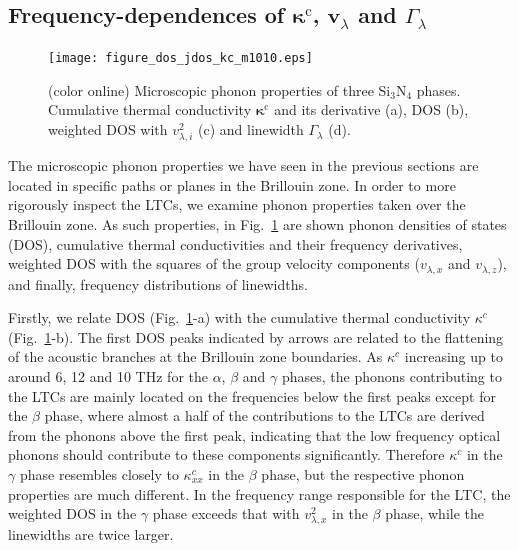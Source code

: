 \documentclass[twocolumn,amsmath,amssymb,a4paper,prb,superscriptaddress,floatfix]{revtex4-1}
\begin{document}
\subsection{Frequency-dependences of $\boldsymbol{\kappa}^\text{c}$, $\mathbf{v}$$_\lambda$ and $\Gamma_\lambda$}

\begin{figure}[ht]
 \begin{center}
  \texttt{[image: figure\_dos\_jdos\_kc\_m1010.eps]}
  \caption{(color online) Microscopic phonon properties of three Si$_3$N$_4$
	  phases. Cumulative thermal conductivity $\mathbf{\kappa}^\text{c}$ and its derivative
	  (a), DOS (b), weighted DOS with $v_{\lambda,i}^2$ (c) and linewidth $\Gamma_\lambda$ (d).
  \label{fig:Fig5_338_rev} }
 \end{center}
\end{figure}

The microscopic phonon properties we have seen in the previous sections are
located in specific paths or planes in the Brillouin zone. In order to more
rigorously inspect the LTCs, we examine  phonon properties taken over the
Brillouin zone. As such properties, in Fig.~\ref{fig:Fig5_338_rev} are shown
phonon densities of states (DOS), cumulative thermal conductivities and their
frequency derivatives, weighted DOS with the squares of the group velocity
components ($v_{\lambda,x}$ and $v_{\lambda,z}$), and finally,
frequency distributions of linewidths.

Firstly, we relate DOS (Fig.~\ref{fig:Fig5_338_rev}-a) with the cumulative
thermal conductivity $\kappa^c$ (Fig.~\ref{fig:Fig5_338_rev}-b). The first DOS
peaks indicated by arrows are related to the flattening of the acoustic
branches at the Brillouin zone boundaries. As $\kappa^c$ increasing up to
around 6, 12 and 10 THz for the $\alpha$, $\beta$ and $\gamma$ phases, the
phonons contributing to the LTCs are mainly located on the frequencies below
the first peaks except for the $\beta$ phase, where almost a half of the
contributions to the LTCs are derived from the phonons above the first peak,
indicating that the low frequency optical phonons should contribute to these
components significantly.  Therefore $\kappa^c$ in the $\gamma$ phase resembles
closely to $\kappa_{xx}^c$ in the $\beta$ phase, but the respective phonon
properties are much different. In the frequency range responsible for the LTC,
the weighted DOS in the $\gamma$ phase exceeds that with $v_{\lambda,x}^2$ in
the $\beta$ phase, while the linewidths are twice larger.
\end{document}
